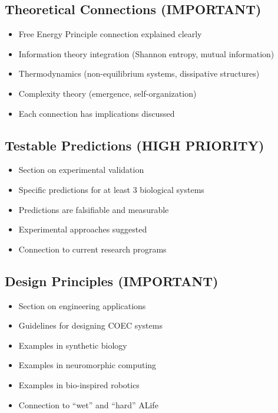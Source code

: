 \documentclass[11pt]{article}
\begin{document}
\subsection{Theoretical Connections (\textcolor{normal}{IMPORTANT})}

\begin{itemize}[label=$\square$]
    \item Free Energy Principle connection explained clearly
    \item Information theory integration (Shannon entropy, mutual information)
    \item Thermodynamics (non-equilibrium systems, dissipative structures)
    \item Complexity theory (emergence, self-organization)
    \item Each connection has implications discussed
\end{itemize}

\subsection{Testable Predictions (\textcolor{important}{HIGH PRIORITY})}

\begin{itemize}[label=$\square$]
    \item Section on experimental validation
    \item Specific predictions for at least 3 biological systems
    \item Predictions are falsifiable and measurable
    \item Experimental approaches suggested
    \item Connection to current research programs
\end{itemize}

\subsection{Design Principles (\textcolor{normal}{IMPORTANT})}

\begin{itemize}[label=$\square$]
    \item Section on engineering applications
    \item Guidelines for designing COEC systems
    \item Examples in synthetic biology
    \item Examples in neuromorphic computing
    \item Examples in bio-inspired robotics
    \item Connection to ``wet'' and ``hard'' ALife
\end{itemize}
\end{document}
